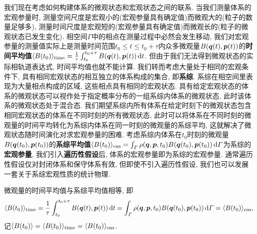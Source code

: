 我们现在考虑如何构建体系的微观状态和宏观状态之间的联系. 当我们测量体系的宏观参量时, 测量空间尺度是宏观小的(宏观参量具有确定值)而微观大的(粒子的数量足够多), 测量时间尺度是宏观短的(宏观参量具有确定值)而微观长的(粒子的微观状态已发生变化). 相空间$ \varGamma $中的相点在测量过程中必然会发生移动, 我们对宏观参量的测量值实际上是测量时间范围$ t_0 \leq t \leq t_0 + \tau $内众多微观量$ B(\vb*{q}(t),\vb*{p}(t)) $的\textbf{时间平均值}$ \langle B(t_0) \rangle_{\mathrm{time}} = \frac{1}{\tau} \int_{t_0}^{t_0+\tau} B(\vb*{q}(t),\vb*{p}(t))\dd{t} $. 但由于我们无法得到微观状态的实际相轨道表达式, 时间平均值也就不能计算. 我们转而考虑大量处于相同的宏观条件下, 具有相同宏观状态的相互独立的体系构成的集合, 即\textbf{系综}. 系综在相空间里表现为大量相点构成的区域, 这些相点具有相同的宏观状态. 具有给定宏观状态的体系的微观状态可以视作处于指定概率分布的一组系综内体系的微观状态, 此时该体系的微观状态处于混合态. 我们期望系综内所有体系在给定时刻下的微观状态包含相同宏观状态的体系在不同时刻的所有微观状态, 此时可以将体系在不同时刻的微观量的时间平均转化为系综内体系在同一时刻的微观量的系综平均, 这就解决了微观状态随时间演化对求宏观参量的困难. 考虑系综内体系在$ t_0 $时刻的微观量$ B(\vb*{q}(t_0),\vb*{p}(t_0)) $的\textbf{系综平均值}$ \langle B(t_0) \rangle_{\mathrm{ens}} = \int_{\varGamma} \rho(\vb*{q},\vb*{p},t_0) B(\vb*{q}(t_0),\vb*{p}(t_0)) \dd{\varGamma} $为系综的\textbf{宏观参量}, 我们引入\textbf{遍历性假设}后, 体系的宏观参量即为系综的宏观参量. 通常遍历性假设仅对封闭体系和保守体系有效, 但即使不引入遍历性假设, 我们也可以发展一套关于系综宏观性质的统计物理.

\begin{postulate}[遍历性假设]\label{pos:遍历性假设}
    微观量的时间平均值与系综平均值相等, 即
    \begin{equation}
        \langle B(t_0) \rangle_{\mathrm{time}} = \frac{1}{\tau} \int_{t_0}^{t_0+\tau} B(\vb*{q}(t),\vb*{p}(t))\dd{t} = \int_{\varGamma} \rho(\vb*{q},\vb*{p},t_0) B(\vb*{q}(t_0),\vb*{p}(t_0)) \dd{\varGamma} = \langle B(t_0) \rangle_{\mathrm{ens}},
    \end{equation}
    记$ \langle B(t_0)\rangle = \langle B(t_0) \rangle_{\mathrm{time}} = \langle B(t_0) \rangle_{\mathrm{ens}} $.
\end{postulate}

